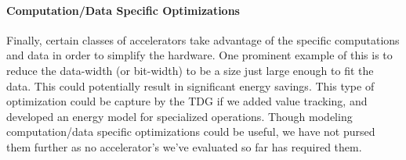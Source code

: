 \paragraph{Computation/Data Specific Optimizations}  
Finally, certain classes of accelerators take advantage of the specific
computations and data in order to simplify the hardware.  One prominent example
of this is to reduce the data-width (or bit-width) to be a size just large
enough to fit the data.  This could potentially result in significant energy
savings.  This type of optimization could be capture by the TDG if we added
value tracking, and developed an energy model for specialized operations.  
Though modeling computation/data specific optimizations could be
useful, we have not pursed them further as no accelerator's we've evaluated so
far has required them.


